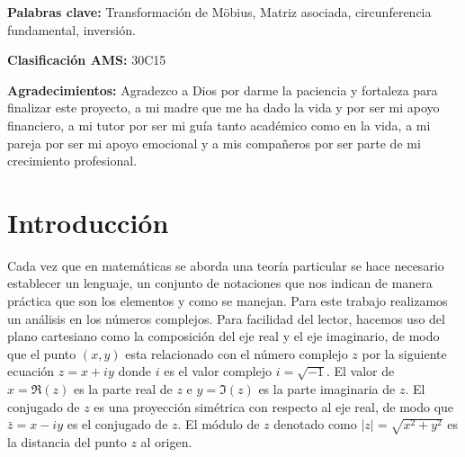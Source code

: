 \documentclass{matematicasud}
\begin{document}
\maketitle


\textbf{Palabras clave: } Transformación de Möbius, Matriz asociada, circunferencia fundamental, inversión.

\textbf{Clasificación AMS:} 30C15

\textbf{Agradecimientos: } Agradezco a Dios por darme la paciencia y fortaleza para finalizar este proyecto, a mi madre que me ha dado la vida y por ser mi apoyo financiero, a mi tutor por ser mi guía tanto académico como en la vida, a mi pareja por ser mi apoyo emocional y a mis compañeros por ser parte de mi crecimiento profesional.

\newpage






\section{Introducción}\label{cap:1}

Cada vez que en matemáticas se aborda una teoría particular se hace necesario establecer un lenguaje, un conjunto de notaciones que nos indican de manera práctica que son los elementos y como se manejan. Para este trabajo realizamos un análisis en los números complejos. Para facilidad del lector, hacemos uso del plano cartesiano como la composición del eje real y el eje imaginario, de modo que el punto $(x,y)$ esta relacionado con el número complejo $z$ por la siguiente ecuación $z = x + iy$ donde $i$ es el valor complejo $i =\sqrt{-1}$. El valor de $x = \Re(z)$ es la parte real de $z$ e $y = \Im(z)$ es la parte imaginaria de $z$. El conjugado de $z$ es una proyección simétrica con respecto al eje real, de modo que $\bar{z} = x-iy$ es el conjugado de $z$. El módulo de $z$ denotado como $|z| = \sqrt{x^2+y^2}$ es la distancia del punto $z$ al origen.
\end{document}
